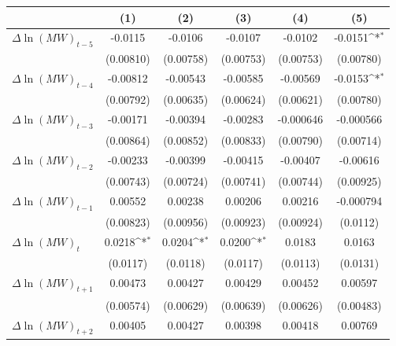 {
\def\sym#1{\ifmmode^{#1}\else\(^{#1}\)\fi}
\begin{tabular}{l*{5}{c}}
\hline\hline
          &\multicolumn{1}{c}{(1)}         &\multicolumn{1}{c}{(2)}         &\multicolumn{1}{c}{(3)}         &\multicolumn{1}{c}{(4)}         &\multicolumn{1}{c}{(5)}         \\
\hline
$\Delta \ln(MW)_{t-5}$&  -0.0115         &  -0.0106         &  -0.0107         &  -0.0102         &  -0.0151\sym{*}  \\
          &(0.00810)         &(0.00758)         &(0.00753)         &(0.00753)         &(0.00780)         \\
[1em]
$\Delta \ln(MW)_{t-4}$& -0.00812         & -0.00543         & -0.00585         & -0.00569         &  -0.0153\sym{*}  \\
          &(0.00792)         &(0.00635)         &(0.00624)         &(0.00621)         &(0.00780)         \\
[1em]
$\Delta \ln(MW)_{t-3}$& -0.00171         & -0.00394         & -0.00283         &-0.000646         &-0.000566         \\
          &(0.00864)         &(0.00852)         &(0.00833)         &(0.00790)         &(0.00714)         \\
[1em]
$\Delta \ln(MW)_{t-2}$& -0.00233         & -0.00399         & -0.00415         & -0.00407         & -0.00616         \\
          &(0.00743)         &(0.00724)         &(0.00741)         &(0.00744)         &(0.00925)         \\
[1em]
$\Delta \ln(MW)_{t-1}$&  0.00552         &  0.00238         &  0.00206         &  0.00216         &-0.000794         \\
          &(0.00823)         &(0.00956)         &(0.00923)         &(0.00924)         & (0.0112)         \\
[1em]
$\Delta \ln(MW)_{t}$&   0.0218\sym{*}  &   0.0204\sym{*}  &   0.0200\sym{*}  &   0.0183         &   0.0163         \\
          & (0.0117)         & (0.0118)         & (0.0117)         & (0.0113)         & (0.0131)         \\
[1em]
$\Delta \ln(MW)_{t+1}$&  0.00473         &  0.00427         &  0.00429         &  0.00452         &  0.00597         \\
          &(0.00574)         &(0.00629)         &(0.00639)         &(0.00626)         &(0.00483)         \\
[1em]
$\Delta \ln(MW)_{t+2}$&  0.00405         &  0.00427         &  0.00398         &  0.00418         &  0.00769         \\

\end{tabular}}
